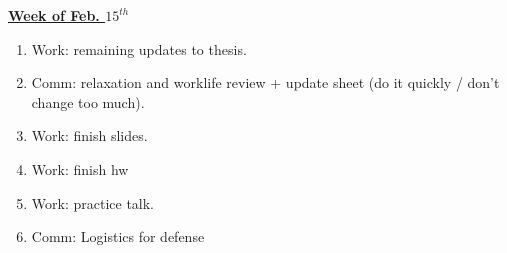 \documentclass[11pt]{article}
\begin{document}
           {\small \underline{\textbf{Week of Feb. $15^{th}$}} }\\
           \begin{enumerate}
           \item \small Work: remaining updates to thesis. 
           \item \small Comm: relaxation and worklife review + update
             sheet  (do it quickly / don't change too much). 
           \item \small Work: finish slides. 
           \item \small Work: finish hw
           \item \small Work: practice talk. 
             \small \item \small Comm: Logistics for defense
           \end{enumerate}
           \newpage
           
\end{document}
